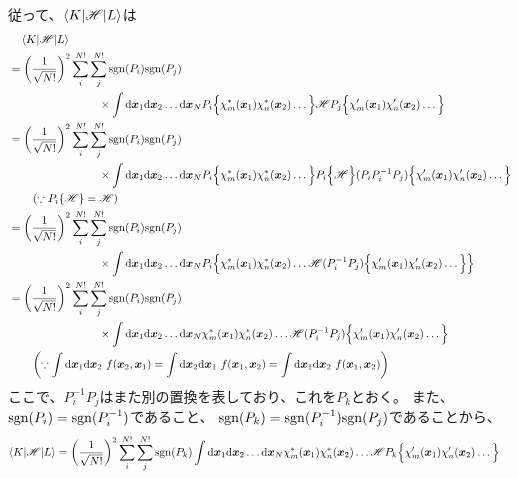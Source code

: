従って、$\braket{K|{\mathscr{H}}|L}$は
\begin{align}
&\quad
	\braket{K|\H|L} \nonumber \\
&=
	\left(
		\frac{1}{\sqrt{N!}}
	\right)^2
	\sum_i^{N!}
	\sum_j^{N!}
		\sgn(P_i)
		\sgn(P_j) \nonumber \\ &\qquad\qquad\qquad\qquad \times
		\int \d\x_1 \d\x_2 \dots \d\x_N
			P_i\Bigl\{
				\chi_m^\ast(\x_1) \chi_n^\ast(\x_2) \dots
			\Bigr\}
			\H
			P_j\Bigl\{
				\chi_m'(\x_1) \chi_n'(\x_2) \dots
			\Bigr\} \\
%
%
&=
	\left(
		\frac{1}{\sqrt{N!}}
	\right)^2
	\sum_i^{N!}
	\sum_j^{N!}
		\sgn(P_i)
		\sgn(P_j) \nonumber \\ &\qquad\qquad\qquad\qquad \times
		\int \d\x_1 \d\x_2 \dots \d\x_N
			P_i\Bigl\{
				\chi_m^\ast(\x_1) \chi_n^\ast(\x_2) \dots
			\Bigr\}
			P_i\Bigl\{
				\H
			\Bigr\}
			(P_iP_i^{-1}P_j)\Bigl\{
				\chi_m'(\x_1) \chi_n'(\x_2) \dots
			\Bigr\} \\
	&\qquad
	\left(
		\because P_i\{\H\} = \H
	\right) \nonumber \\
%
%
&=
	\left(
		\frac{1}{\sqrt{N!}}
	\right)^2
	\sum_i^{N!}
	\sum_j^{N!}
		\sgn(P_i)
		\sgn(P_j) \nonumber \\ &\qquad\qquad\qquad\qquad \times
		\int \d\x_1 \d\x_2 \dots \d\x_N
			P_i\Bigl\{
				\chi_m^\ast(\x_1) \chi_n^\ast(\x_2) \dots
				\H
				(P_i^{-1}P_j)\Bigl\{
					\chi_m'(\x_1) \chi_n'(\x_2) \dots
				\Bigr\}
			\Bigr\} \\
%
%
&=
	\left(
		\frac{1}{\sqrt{N!}}
	\right)^2
	\sum_i^{N!}
	\sum_j^{N!}
		\sgn(P_i)
		\sgn(P_j) \nonumber \\ &\qquad\qquad\qquad\qquad \times
		\int \d\x_1 \d\x_2 \dots \d\x_N
			\chi_m^\ast(\x_1) \chi_n^\ast(\x_2) \dots
			\H
			(P_i^{-1}P_j)\Bigl\{
				\chi_m'(\x_1) \chi_n'(\x_2) \dots
			\Bigr\} \\
	&\qquad
	\left(
		\because \int\d\x_1\d\x_2\ f(\x_2,\x_1) = \int\d\x_2\d\x_1\ f(\x_1,\x_2) = \int\d\x_1\d\x_2\ f(\x_1,\x_2)
	\right) \nonumber
\end{align}
ここで、$P_i^{-1}P_j$はまた別の置換を表しており、これを$P_k$とおく。
また、${\rm sgn}(P_i)={\rm sgn}(P_i^{-1})$であること、
${\rm sgn}(P_k)={\rm sgn}(P_i^{-1}){\rm sgn}(P_j)$であることから、
\begin{align}
	\braket{K|{\mathscr{H}}|L}
&=
	\left(
		\frac{1}{\sqrt{N!}}
	\right)^2
	\sum_i^{N!}
	\sum_j^{N!}
		{\rm sgn}(P_k)
		\int {\ensuremath{\rm d}}{\ensuremath{\bm{x}}}_1 {\rm d}{\bm{x}}_2 \dots {\ensuremath{\rm d}}{\ensuremath{\bm{x}}}_N
			\chi_m^\ast({\bm{x}}_1) \chi_n^\ast({\bm{x}}_2) \dots
			{\ensuremath{\mathscr{H}}}
			P_k\Bigl\{
				\chi_m'({\bm{x}}_1) \chi_n'({\bm{x}}_2) \dots
			\Bigr\}
\end{align}
